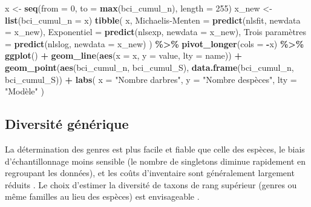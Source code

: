 \documentclass[
  11pt,
  american,
  a4paper,
  extrafontsizes,onecolumn,openright
  ]{memoir}
\newenvironment{Shaded}{\begin{snugshade}}{\end{snugshade}}
\newcommand{\AttributeTok}[1]{\textcolor[rgb]{0.13,0.29,0.53}{#1}}
\newcommand{\DecValTok}[1]{\textcolor[rgb]{0.00,0.00,0.81}{#1}}
\newcommand{\FunctionTok}[1]{\textcolor[rgb]{0.13,0.29,0.53}{\textbf{#1}}}
\newcommand{\NormalTok}[1]{#1}
\newcommand{\OtherTok}[1]{\textcolor[rgb]{0.56,0.35,0.01}{#1}}
\newcommand{\SpecialCharTok}[1]{\textcolor[rgb]{0.81,0.36,0.00}{\textbf{#1}}}
\newcommand{\StringTok}[1]{\textcolor[rgb]{0.31,0.60,0.02}{#1}}
\begin{document}
\begin{Shaded}
\begin{Highlighting}[]
\NormalTok{x }\OtherTok{\textless{}{-}} \FunctionTok{seq}\NormalTok{(}\AttributeTok{from =} \DecValTok{0}\NormalTok{, }\AttributeTok{to =} \FunctionTok{max}\NormalTok{(bci\_cumul\_n), }\AttributeTok{length =} \DecValTok{255}\NormalTok{)}
\NormalTok{x\_new }\OtherTok{\textless{}{-}} \FunctionTok{list}\NormalTok{(}\AttributeTok{bci\_cumul\_n =}\NormalTok{ x)}
\FunctionTok{tibble}\NormalTok{(}
\NormalTok{  x, }
  \StringTok{\textasciigrave{}}\AttributeTok{Michaelis{-}Menten}\StringTok{\textasciigrave{}} \OtherTok{=} \FunctionTok{predict}\NormalTok{(nlsfit, }\AttributeTok{newdata =}\NormalTok{ x\_new),}
  \StringTok{\textasciigrave{}}\AttributeTok{Exponentiel}\StringTok{\textasciigrave{}} \OtherTok{=} \FunctionTok{predict}\NormalTok{(nlsexp, }\AttributeTok{newdata =}\NormalTok{ x\_new),}
  \StringTok{\textasciigrave{}}\AttributeTok{Trois paramètres}\StringTok{\textasciigrave{}} \OtherTok{=} \FunctionTok{predict}\NormalTok{(nlslog, }\AttributeTok{newdata =}\NormalTok{ x\_new)}
\NormalTok{) }\SpecialCharTok{\%\textgreater{}\%} 
  \FunctionTok{pivot\_longer}\NormalTok{(}\AttributeTok{cols =} \SpecialCharTok{{-}}\NormalTok{x) }\SpecialCharTok{\%\textgreater{}\%} 
  \FunctionTok{ggplot}\NormalTok{() }\SpecialCharTok{+}
    \FunctionTok{geom\_line}\NormalTok{(}\FunctionTok{aes}\NormalTok{(}\AttributeTok{x =}\NormalTok{ x, }\AttributeTok{y =}\NormalTok{ value, }\AttributeTok{lty =}\NormalTok{ name)) }\SpecialCharTok{+}
    \FunctionTok{geom\_point}\NormalTok{(}\FunctionTok{aes}\NormalTok{(bci\_cumul\_n, bci\_cumul\_S), }\FunctionTok{data.frame}\NormalTok{(bci\_cumul\_n, bci\_cumul\_S)) }\SpecialCharTok{+}
    \FunctionTok{labs}\NormalTok{(}
      \AttributeTok{x =} \StringTok{"Nombre d\textquotesingle{}arbres"}\NormalTok{, }
      \AttributeTok{y =} \StringTok{"Nombre d\textquotesingle{}espèces"}\NormalTok{, }
      \AttributeTok{lty =} \StringTok{"Modèle"}
\NormalTok{    )}
\end{Highlighting}
\end{Shaded}

\normalsize

\subsection{Diversité générique}\label{diversituxe9-guxe9nuxe9rique}

La détermination des genres est plus facile et fiable que celle des espèces, le biais d'échantillonnage moins sensible (le nombre de singletons diminue rapidement en regroupant les données), et les coûts d'inventaire sont généralement largement réduits \autocite{Balmford1996b}.
Le choix d'estimer la diversité de taxons de rang supérieur (genres ou même familles au lieu des espèces) est envisageable \autocite{Williams1994}.
\end{document}
